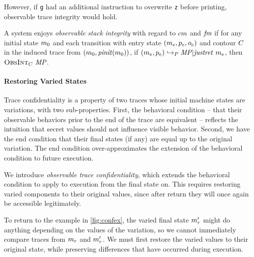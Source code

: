 \documentclass[acmsmall,review,anonymous]{acmart}\settopmatter{printfolios=true,printccs=false,printacmref=false}
\begin{document}
    However, if {\tt g} had an additional instruction to overwrite {\tt z}
    before printing, observable trace integrity would hold.


      A system enjoys {\em observable stack integrity} with regard to
      \(cm\) and \(\mathit{fm}\) if for any initial state \(m_0\) and
      each transition with entry state \((m_e,p_e,o_e)\)
      and contour \(C\) in the induced trace from
      \((m_0,\mathit{pinit}(m_0))\), if
      \((m_e,p_e) \hookrightarrow_P \mathit{MP} | \mathit{justret}\ m_e\),
      then \(\text{\sc ObsInt}_C ~ \mathit{MP}\).

    \paragraph{Restoring Varied States}

      Trace confidentiality is a property of two traces whose initial machine
      states are variations, with two sub-properties. First, the behavioral
      condition -- that their observable behaviors prior to the end of the
      trace are equivalent -- reflects the intuition that secret values should
      not influence visible behavior. Second, we have the end condition that
      their final states (if any) are equal up to the original variation. The
      end condition over-approximates the extension of the behavioral condition
      to future execution.

      We introduce {\em observable trace confidentiality}, which extends the
      behavioral condition to apply to execution from the final state on.
      This requires restoring varied components to their original values,
      since after return they will once again be accessible legitimately.

      To return to the example in \cref{fig:confex}, the varied final state
      \(m_r'\) might do anything depending on the values of the variation,
      so we cannot immediately compare traces from \(m_r\) and
      \(m_r'\). We must first restore the varied values to their original
      state, while preserving differences that have occurred during
      execution.
\end{document}
